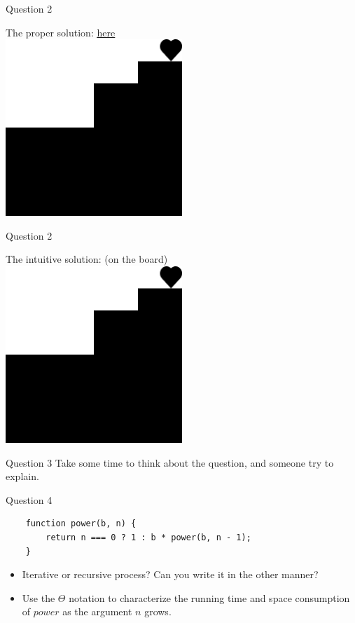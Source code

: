 \documentclass[10pt]{beamer}
\begin{document}
\begin{frame}[fragile]{Question 2}
\begin{center}
The proper solution: \href{https://share.sourceacademy.nus.edu.sg/q1proper}{\underline{here}} \\
\vspace{1em}
\includegraphics[width = 0.5\textwidth]{img/q1.png}
\end{center}
\end{frame}

\begin{frame}[fragile]{Question 2}
\begin{center}
The intuitive solution: (on the board) \\
\vspace{1em}
\includegraphics[width = 0.5\textwidth]{img/q1.png}
\end{center}
\end{frame}

\begin{frame}[fragile]{Question 3}
Take some time to think about the question, and someone try to explain.
\end{frame}

\begin{frame}[fragile]{Question 4}
\begin{verbatim}
    function power(b, n) {
        return n === 0 ? 1 : b * power(b, n - 1);
    }
\end{verbatim}
\begin{itemize}
    \item Iterative or recursive process? Can you write it in the other manner?
    \item Use the $\Theta$ notation to characterize the running time and space consumption of $power$ as the argument $n$ grows.
\end{itemize}
\end{frame}
\end{document}
